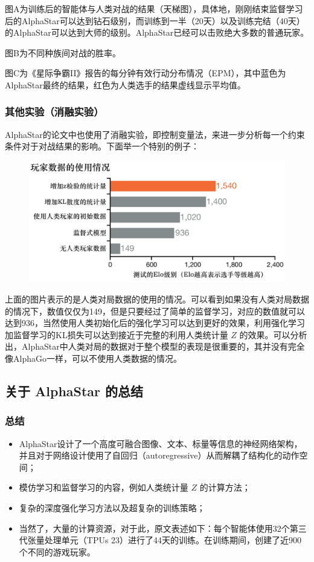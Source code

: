 图A为训练后的智能体与人类对战的结果（天梯图），具体地，刚刚结束监督学习后的AlphaStar可以达到钻石级别，而训练到一半（20天）以及训练完结（40天）的AlphaStar可以达到大师的级别。AlphaStar已经可以击败绝大多数的普通玩家。

图B为不同种族间对战的胜率。

图C为《星际争霸II》报告的每分钟有效行动分布情况（EPM），其中蓝色为AlphaStar最终的结果，红色为人类选手的结果虚线显示平均值。

\subsubsection{其他实验（消融实验）} 

AlphaStar的论文中也使用了消融实验，即控制变量法，来进一步分析每一个约束条件对于对战结果的影响。下面举一个特别的例子：

\begin{figure}[htpb]
    \centering
    \includegraphics[width=0.5\linewidth]{res/ch13/13.8}
    \caption{}
    \label{fig:}
\end{figure}

上面的图片表示的是人类对局数据的使用的情况。可以看到如果没有人类对局数据的情况下，数值仅仅为149，但是只要经过了简单的监督学习，对应的数值就可以达到936，当然使用人类初始化后的强化学习可以达到更好的效果，利用强化学习加监督学习的KL损失可以达到接近于完整的利用人类统计量 $Z$ 的效果。可以分析出，AlphaStar中人类对局的数据对于整个模型的表现是很重要的，其并没有完全像AlphaGo一样，可以不使用人类数据的情况。

\subsection{关于 AlphaStar 的总结} 

\subsubsection{总结} 
\begin{itemize}
    \item AlphaStar设计了一个高度可融合图像、文本、标量等信息的神经网络架构，并且对于网络设计使用了自回归（autoregressive）从而解耦了结构化的动作空间；
    \item 模仿学习和监督学习的内容，例如人类统计量 $Z$ 的计算方法；
    \item 复杂的深度强化学习方法以及超复杂的训练策略；
    \item 当然了，大量的计算资源，对于此，原文表述如下：每个智能体使用32个第三代张量处理单元（TPUs 23）进行了44天的训练。在训练期间，创建了近900个不同的游戏玩家。
\end{itemize}



